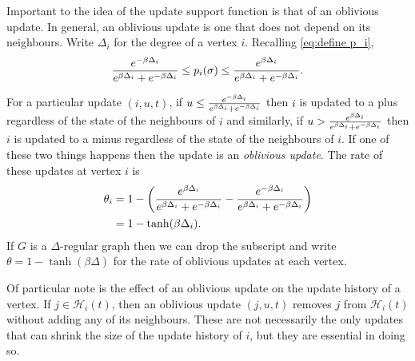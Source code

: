 	Important to the idea of the update support function is that of an oblivious update. In general, an oblivious update is one that does not depend on its neighbours. Write $\Delta_i$ for the degree of a vertex $i$. Recalling \eqref{eq:define p_i},
	\begin{equation}
		\frac{e^{-\beta \Delta_i}}{e^{\beta \Delta_i} + e^{-\beta \Delta_i}} \leq p_i(\sigma) \leq \frac{e^{\beta \Delta_i}}{e^{\beta \Delta_i} + e^{-\beta \Delta_i}}.
	\end{equation}
	
	For a particular update $(i, u, t)$, if $u \leq \frac{e^{-\beta \Delta_i}}{e^{\beta \Delta_i} + e^{-\beta \Delta_i}}$ then $i$ is updated to a plus regardless of the state of the neighbours of $i$ and similarly, if $u > \frac{e^{\beta \Delta_i}}{e^{\beta \Delta_i} + e^{-\beta \Delta_i}}$ then $i$ is updated to a minus regardless of the state of the neighbours of $i$. If one of these two things happens then the update is an \emph{oblivious update}. The rate of these updates at vertex $i$ is
	\begin{align}
		\theta_i &= 1 - \left(\frac{e^{\beta \Delta_i}}{e^{\beta \Delta_i} + e^{-\beta \Delta_i}} - \frac{e^{-\beta \Delta_i}}{e^{\beta \Delta_i} + e^{-\beta \Delta_i}}\right)\\
			&= 1 - \tanh(\beta \Delta_i).
	\end{align}
	If $G$ is a $\Delta$-regular graph then we can drop the subscript and write $\theta = 1 - \tanh(\beta \Delta)$ for the rate of oblivious updates at each vertex.

	Of particular note is the effect of an oblivious update on the update history of a vertex. If $j \in \mathcal{H}_i(t)$, then an oblivious update $(j, u, t)$ removes $j$ from $\mathcal{H}_i(t)$ without adding any of its neighbours. These are not necessarily the only updates that can shrink the size of the update history of $i$, but they are essential in doing so.

	

